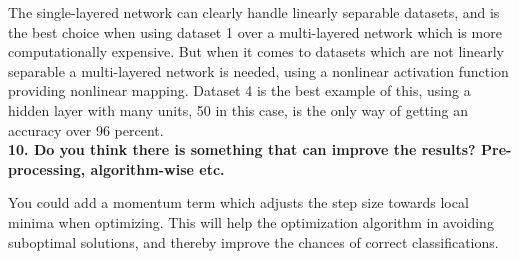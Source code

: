 \documentclass[twocolumn]{report}
\begin{document}
	The single-layered network can clearly handle linearly separable datasets, and is the best choice when using dataset 1 over a multi-layered network which is more computationally expensive. But when it comes to datasets which are not linearly separable a multi-layered network is needed, using a nonlinear activation function providing nonlinear mapping. Dataset 4 is the best example of this, using a hidden layer with many units, 50 in this case, is the only way of getting an accuracy over 96 percent. \\
	
	\textbf{10. Do you think there is something that can improve the results? Pre-processing, algorithm-wise etc.}
	
	You could add a momentum term which adjusts the step size towards local minima when optimizing. This will help the optimization algorithm in avoiding suboptimal solutions, and thereby improve the chances of correct classifications.
	
\end{document}
